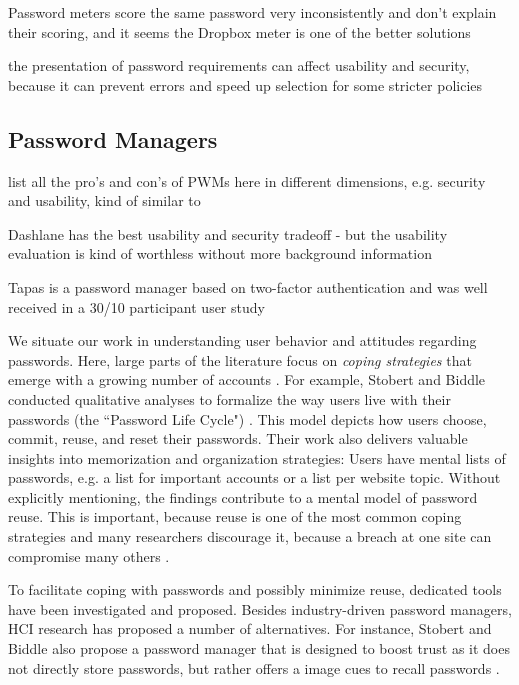 	Password meters score the same password very inconsistently and don't explain their scoring, and it seems the Dropbox meter is one of the better solutions \cite{Carnavalet2014AnalyzingPWStrengthMeters}
	
	the presentation of password requirements can affect usability and security, because it can prevent errors and speed up selection for some stricter policies \cite{Shay2015SpoonfulOfSugar}
	
	\subsection{Password Managers}
	
	list all the pro's and con's of PWMs here in different dimensions, e.g. security and usability, kind of similar to \cite{Bonneau2012ReplacePasswords}
	
	Dashlane has the best usability and security tradeoff - but the usability evaluation is kind of worthless without more background information \cite{AriasCabarcos2016ComparingPWM}
	
	Tapas is a password manager based on two-factor authentication and was well received in a 30/10 participant user study \cite{McCarney2012Tapas, McCarney2013PWMThesis}
	
	We situate our work in understanding user behavior and attitudes regarding passwords. Here, large parts of the literature focus on \textit{coping strategies} that emerge with a growing number of accounts \cite{Florencio2007LargeScaleStudyPasswordHabits, Florencio2014PasswordPortfoliosFiniteUser}. For example, Stobert and Biddle conducted qualitative analyses to formalize the way users live with their passwords (the ``Password Life Cycle") \cite{Stobert2014PasswordLifeCycle}. This model depicts how users choose, commit, reuse, and reset their passwords. Their work also delivers valuable insights into memorization and organization strategies: Users have mental lists of passwords, e.g. a list for important accounts or a list per website topic. Without explicitly mentioning, the findings contribute to a mental model of password reuse. This is important, because reuse is one of the most common coping strategies \cite{Das2014TangledWeb, Gaw2006PasswordManagement, Hayashi2011DiaryStudyPWs} and many researchers discourage it, because a breach at one site can compromise many others \cite{Bonneau2012ScienceOfGuessing, Komanduri2011OfPasswordsAndPeople}. 
	
	To facilitate coping with passwords and possibly minimize reuse, dedicated tools have been investigated and proposed. Besides industry-driven password managers, HCI research has proposed a number of alternatives. For instance, Stobert and Biddle also propose a password manager that is designed to boost trust as it does not directly store passwords, but rather offers a image cues to recall passwords \cite{Stobert2014PWMThatDoesntRemember}. 
	
